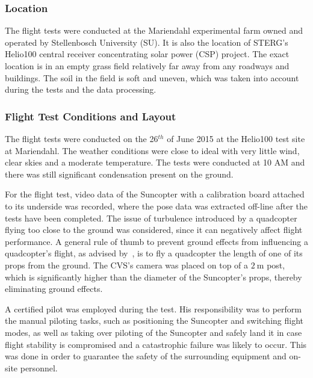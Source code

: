 \subsubsection{Location}

The flight tests were conducted at the Mariendahl experimental farm owned and operated by Stellenbosch University (SU). It is also the location of STERG's Helio100 central receiver concentrating solar power (CSP) project. The exact location is in an empty grass field relatively far away from any roadways and buildings. The soil in the field is soft and uneven, which was taken into account during the tests and the data processing. 

\subsubsection{Flight Test Conditions and Layout}

The flight tests were conducted on the 26$^{th}$ of June 2015 at the Helio100 test site at Mariendahl. The weather conditions were close to ideal with very little wind, clear skies and a moderate temperature. The tests were conducted at 10 AM and there was still significant condensation present on the ground. %

For the flight test, video data of the Suncopter with a calibration board attached to its underside was recorded, where the pose data was extracted off-line after the tests have been completed. The issue of turbulence introduced by a quadcopter flying too close to the ground was considered, since it can negatively affect flight performance. A general rule of thumb to prevent ground effects from influencing a quadcopter's flight, as advised by~\cite{basson-flight-test}, is to fly a quadcopter the length of one of its props from the ground. The CVS's camera was placed on top of a $\SI{2}{\m}$ post, which is significantly higher than the diameter of the Suncopter's props, thereby eliminating ground effects.

A certified pilot was employed during the test. His responsibility was to perform the manual piloting tasks, such as positioning the Suncopter and switching flight modes, as well as taking over piloting of the Suncopter and safely land it in case flight stability is compromised and a catastrophic failure was likely to occur. This was done in order to guarantee the safety of the surrounding equipment and on-site personnel. 

